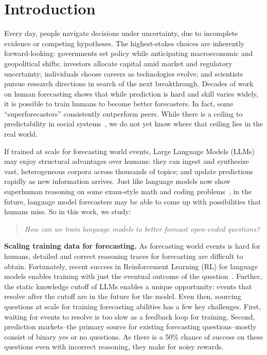 \documentclass{article} %
\begin{document}
\section{Introduction}

Every day, people navigate decisions under uncertainty, due to incomplete evidence or competing hypotheses. The highest-stakes choices are inherently forward-looking: governments set policy while anticipating macroeconomic and geopolitical shifts; investors allocate capital amid market and regulatory uncertainty; individuals choose careers as technologies evolve; and scientists pursue research directions in search of the next breakthrough. Decades of work~\citep{tetlock2014forecasting} on human forecasting shows that while prediction is hard and skill varies widely, it is possible to train humans to become better forecasters. In fact, some  ``superforecasters'' consistently outperform peers. While there is a ceiling to predictability in social systems~\citep{franklin1999real}, we do not yet know where that ceiling lies in the real world.

 If trained at scale for forecasting world events, Large Language Models (LLMs) may enjoy structural advantages over humans: they can ingest and synthesize vast, heterogeneous corpora across thousands of topics; and update predictions rapidly as new information arrives. Just like language models now show superhuman reasoning on some exam-style math and coding problems~\citep{icpc_openai_2025}, in the future, language model forecasters may be able to come up with possibilities that humans miss. So in this work, we study:

\begin{quote}
\emph{How can we train language models to better forecast open-ended questions?
}
\end{quote}

\textbf{Scaling training data for forecasting.} As forecasting world events is hard for humans, detailed and correct reasoning traces for forecasting are difficult to obtain. Fortunately, recent success in Reinforcement Learning (RL) for language models enables training with just the eventual outcome of the question~\citep{guo2025deepseek}. Further, the static knowledge cutoff of LLMs enables a unique opportunity: events that resolve after the cutoff are in the future for the model. Even then, sourcing questions at scale for training forecasting abilities has a few key challenges. First, waiting for events to resolve is too slow as a feedback loop for training. Second, prediction markets--the primary source for existing forecasting questions--mostly consist of binary yes or no questions. As there is a 50\% chance of success on these questions even with incorrect reasoning, they make for noisy rewards.
\end{document}

